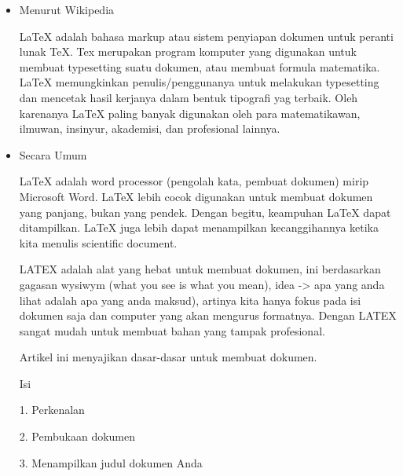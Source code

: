 
\begin{itemize}
	\item Menurut Wikipedia \par

LaTeX adalah bahasa markup atau sistem penyiapan dokumen untuk peranti lunak TeX. Tex merupakan program komputer yang digunakan untuk membuat typesetting suatu dokumen, atau membuat formula matematika. LaTeX memungkinkan penulis/penggunanya untuk melakukan typesetting dan mencetak hasil kerjanya dalam bentuk tipografi yag terbaik. Oleh karenanya LaTeX paling banyak digunakan oleh para matematikawan, ilmuwan, insinyur, akademisi, dan profesional lainnya.\par

	\item Secara Umum\par

\hspace*{0.5in}LaTeX adalah word processor (pengolah kata, pembuat dokumen) mirip Microsoft Word. LaTeX lebih cocok digunakan untuk membuat dokumen yang panjang, bukan yang pendek. Dengan begitu, keampuhan LaTeX dapat ditampilkan. LaTeX juga lebih dapat menampilkan kecanggihannya ketika kita menulis scientific document.\par

LATEX adalah alat yang hebat untuk membuat dokumen, ini berdasarkan gagasan wysiwym (what you see is what you mean), idea -> apa yang anda lihat adalah apa yang anda maksud), artinya kita hanya fokus pada isi dokumen saja dan computer yang akan mengurus formatnya. Dengan LATEX sangat mudah untuk membuat bahan yang tampak profesional.\par

 \par

Artikel ini menyajikan dasar-dasar untuk membuat dokumen.\par

\hspace*{0.5in}Isi\par

\hspace*{0.5in}1. Perkenalan\par

\hspace*{0.5in}2. Pembukaan dokumen\par

\hspace*{0.5in}3. Menampilkan judul dokumen Anda\par


\end{itemize}
